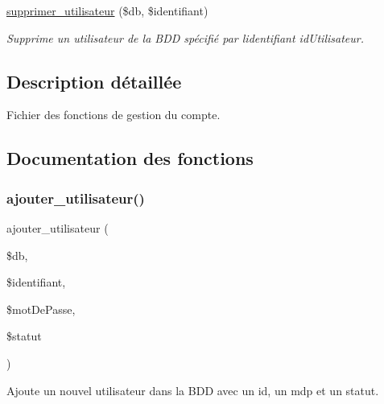\begin{DoxyCompactItemize}
\hyperlink{fonctionCompte_8php_a71d9b591a6c09487582f9f51a162f8f8}{supprimer\+\_\+utilisateur} (\$db, \$identifiant)
\begin{DoxyCompactList}\small\item\em Supprime un utilisateur de la B\+DD spécifié par l\textquotesingle{}identifiant \textquotesingle{}id\+Utilisateur\textquotesingle{}. \end{DoxyCompactList}\end{DoxyCompactItemize}


\subsection{Description détaillée}
Fichier des fonctions de gestion du compte. 



\subsection{Documentation des fonctions}
\mbox{\label{fonctionCompte_8php_aa50c1cf48630472e499d09a15230e8f1}} 
\subsubsection{\texorpdfstring{ajouter\+\_\+utilisateur()}{ajouter\_utilisateur()}}
{\footnotesize\ttfamily ajouter\+\_\+utilisateur (\begin{DoxyParamCaption}\item[{}]{\$db,  }\item[{}]{\$identifiant,  }\item[{}]{\$mot\+De\+Passe,  }\item[{}]{\$statut }\end{DoxyParamCaption})}



Ajoute un nouvel utilisateur dans la B\+DD avec un id, un mdp et un statut. 


